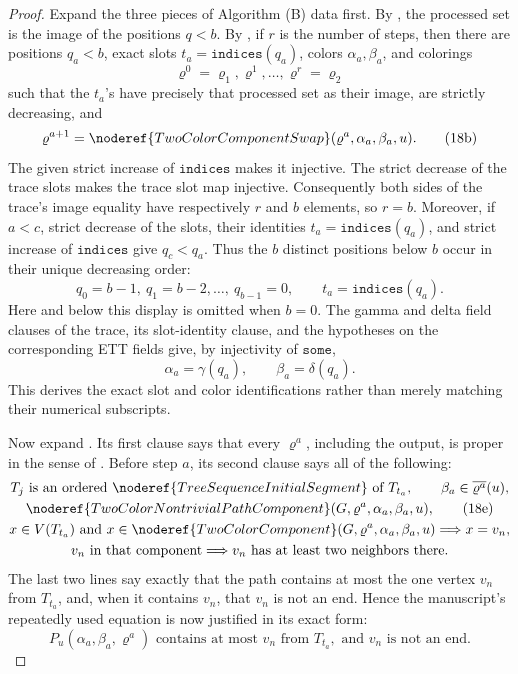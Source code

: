 \begin{proof}
Expand the three pieces of Algorithm (B) data first.  By
, the processed set is the image of
the positions \(q<b\).  By , if
\(r\) is the number of steps, then there are positions \(q_a<b\), exact
slots \(t_a=\mathtt{indices}(q_a)\), colors
\(\alpha_a,\beta_a\), and colorings
\[
 \varrho^0=\varrho_1,\varrho^1,\ldots,
 \varrho^r=\varrho_2                                      \tag{18a}
\]
such that the \(t_a\)'s have precisely that processed set as their image,
are strictly decreasing, and
\[
 \varrho^{a+1}=\noderef{TwoColorComponentSwap}
       (\varrho^a,\alpha_a,\beta_a,u).                      \tag{18b}
\]
The given strict increase of \(\mathtt{indices}\) makes it injective.
The strict decrease of the trace slots makes the trace slot map injective.
Consequently both sides of the trace's image equality have respectively
\(r\) and \(b\) elements, so \(r=b\).  Moreover, if \(a<c\), strict
decrease of the slots, their identities
\(t_a=\mathtt{indices}(q_a)\), and strict increase of
\(\mathtt{indices}\) give \(q_c<q_a\).  Thus the \(b\) distinct positions
below \(b\) occur in their unique decreasing order:
\[
 q_0=b-1,\ q_1=b-2,\ldots,\ q_{b-1}=0,\qquad
 t_a=\mathtt{indices}(q_a).                                \tag{18c}
\]
Here and below this display is omitted when \(b=0\).  The gamma and delta
field clauses of the trace, its slot-identity clause, and the hypotheses
on the corresponding ETT fields give, by injectivity of
\(\mathtt{some}\),
\[
                 \alpha_a=\gamma(q_a),\qquad
                 \beta_a=\delta(q_a).                      \tag{18d}
\]
This derives the exact slot and color identifications rather than merely
matching their numerical subscripts.

Now expand .  Its first clause
says that every \(\varrho^a\), including the output, is proper in the
sense of .  Before step \(a\), its second
clause says all of the following:
\[
 \begin{gathered}
 T_j\text{ is an ordered }\noderef{TreeSequenceInitialSegment}
       \text{ of }T_{t_a},\qquad
 \beta_a\in\overline{\varrho^a}(u),\\
 \noderef{TwoColorNontrivialPathComponent}
       (G,\varrho^a,\alpha_a,\beta_a,u),                    \tag{18e}\\
 x\in V(T_{t_a})\text{ and }x\in
 \noderef{TwoColorComponent}(G,\varrho^a,
       \alpha_a,\beta_a,u)\Longrightarrow x=v_n,\\
 v_n\text{ in that component}\Longrightarrow
 v_n\text{ has at least two neighbors there}.
 \end{gathered}
\]
The last two lines say exactly that the path contains at most the one
vertex \(v_n\) from \(T_{t_a}\), and, when it contains \(v_n\), that
\(v_n\) is not an end.  Hence the manuscript's repeatedly used equation
is now justified in its exact form:
\[
 P_u(\alpha_a,\beta_a,\varrho^a)
 \text{ contains at most }v_n\text{ from }T_{t_a},
 \text{ and }v_n\text{ is not an end}.                     \tag{18}
\]


\end{proof}
